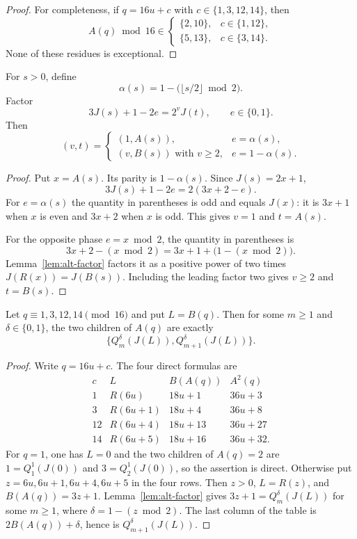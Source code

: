 \begin{proof}
For completeness, if $q=16u+c$ with
$c\in\{1,3,12,14\}$, then
\[
 A(q)\bmod16\in
 \begin{cases}
  \{2,10\},&c\in\{1,12\},\\
  \{5,13\},&c\in\{3,14\}.
 \end{cases}
\]
None of these residues is exceptional.
\end{proof}

\begin{lemma}\label{lem:source-selector}
For $s>0$, define
\[
 \alpha(s)=1-\bigl(\lfloor s/2\rfloor\bmod2\bigr).
\]
Factor
\[
 3J(s)+1-2e=2^v J(t),\qquad e\in\{0,1\}.
\]
Then
\[
 (v,t)=
 \begin{cases}
  (1,A(s)),&e=\alpha(s),\\
  (v,B(s))\text{ with }v\ge2,&e=1-\alpha(s).
 \end{cases}
\]
\end{lemma}

\begin{proof}
Put $x=A(s)$.  Its parity is $1-\alpha(s)$.  Since $J(s)=2x+1$,
\[
 3J(s)+1-2e=2(3x+2-e).
\]
For $e=\alpha(s)$ the quantity in parentheses is odd and equals $J(x)$:
it is $3x+1$ when $x$ is even and $3x+2$ when $x$ is odd.  This gives
$v=1$ and $t=A(s)$.

For the opposite phase $e=x\bmod2$, the quantity in parentheses is
\[
 3x+2-(x\bmod2)=3x+1+\bigl(1-(x\bmod2)\bigr).
\]
Lemma~\ref{lem:alt-factor} factors it as a positive power of two times
$J(R(x))=J(B(s))$.  Including the leading factor two gives $v\ge2$ and
$t=B(s)$.
\end{proof}

\begin{lemma}\label{lem:exceptional-pair}
Let $q\equiv1,3,12,14\pmod {16}$ and put $L=B(q)$.  Then for some
$m\ge1$ and $\delta\in\{0,1\}$, the two children of $A(q)$ are exactly
\[
 \{Q_m^\delta(J(L)),Q_{m+1}^\delta(J(L))\}.
\]
\end{lemma}

\begin{proof}
Write $q=16u+c$.  The four direct formulas are
\[
\begin{array}{c|c|c|c}
 c&L&B(A(q))&A^2(q)\\ \hline
 1&R(6u)&18u+1&36u+3\\
 3&R(6u+1)&18u+4&36u+8\\
 12&R(6u+4)&18u+13&36u+27\\
 14&R(6u+5)&18u+16&36u+32.
\end{array}
\]
For $q=1$, one has $L=0$ and the two children of $A(q)=2$ are
$1=Q_1^1(J(0))$ and $3=Q_2^1(J(0))$, so the assertion is direct.
Otherwise put $z=6u,6u+1,6u+4,6u+5$ in the four rows.  Then $z>0$,
$L=R(z)$, and $B(A(q))=3z+1$.  Lemma~\ref{lem:alt-factor} gives
$3z+1=Q_m^\delta(J(L))$ for some $m\ge1$, where
$\delta=1-(z\bmod2)$.  The last column of the table is
$2B(A(q))+\delta$, hence is $Q_{m+1}^\delta(J(L))$.
\end{proof}

